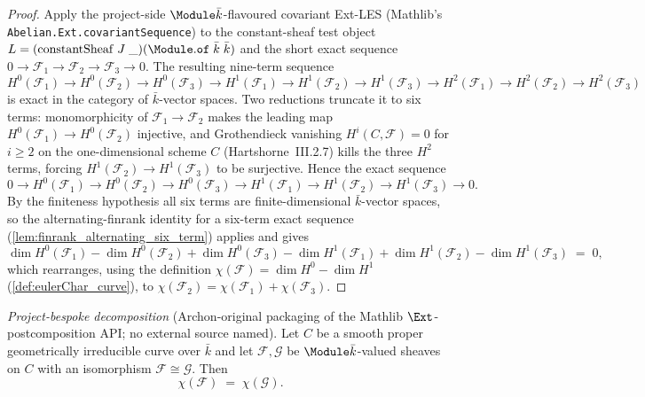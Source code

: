 \begin{proof}
  Apply the project-side \(\Module \bar k\)-flavoured covariant Ext-LES
  (Mathlib's \texttt{Abelian.Ext.covariantSequence}) to the constant-sheaf
  test object \(L = (\mathrm{constantSheaf}\;J\;\_)(\Module.\mathtt{of}\;
  \bar k\;\bar k)\) and the short exact sequence
  \(0 \to \mathcal F_1 \to \mathcal F_2 \to \mathcal F_3 \to 0\). The
  resulting nine-term sequence
  \[
    H^0(\mathcal F_1) \to H^0(\mathcal F_2) \to H^0(\mathcal F_3)
    \to H^1(\mathcal F_1) \to H^1(\mathcal F_2) \to H^1(\mathcal F_3)
    \to H^2(\mathcal F_1) \to H^2(\mathcal F_2) \to H^2(\mathcal F_3)
  \]
  is exact in the category of \(\bar k\)-vector spaces. Two reductions
  truncate it to six terms: monomorphicity of
  \(\mathcal F_1 \to \mathcal F_2\) makes the leading map
  \(H^0(\mathcal F_1) \to H^0(\mathcal F_2)\) injective, and Grothendieck
  vanishing \(H^i(C, \mathcal F) = 0\) for \(i \geq 2\) on the
  one-dimensional scheme \(C\) (Hartshorne~III.2.7) kills the three
  \(H^2\) terms, forcing \(H^1(\mathcal F_2) \to H^1(\mathcal F_3)\) to be
  surjective. Hence the exact sequence
  \[
    0 \to H^0(\mathcal F_1) \to H^0(\mathcal F_2) \to
    H^0(\mathcal F_3) \to H^1(\mathcal F_1) \to H^1(\mathcal F_2)
    \to H^1(\mathcal F_3) \to 0 .
  \]
  By the finiteness hypothesis all six terms are finite-dimensional
  \(\bar k\)-vector spaces, so the alternating-finrank identity for a
  six-term exact sequence (\cref{lem:finrank_alternating_six_term})
  applies and gives
  \[
    \dim H^0(\mathcal F_1) - \dim H^0(\mathcal F_2) + \dim H^0(\mathcal F_3)
    - \dim H^1(\mathcal F_1) + \dim H^1(\mathcal F_2) - \dim H^1(\mathcal F_3)
    \;=\; 0,
  \]
  which rearranges, using the definition
  \(\chi(\mathcal F) = \dim H^0 - \dim H^1\)
  (\cref{def:eulerChar_curve}), to
  \(\chi(\mathcal F_2) = \chi(\mathcal F_1) + \chi(\mathcal F_3)\).

\end{proof}

\begin{lemma}
  \label{lem:euler_char_iso}
  \textit{Project-bespoke decomposition} (Archon-original packaging of
  the Mathlib \(\Ext\)-postcomposition API; no external source named).
  Let \(C\) be a smooth proper geometrically irreducible curve over
  \(\bar k\) and let \(\mathcal F, \mathcal G\) be \(\Module \bar k\)-valued
  sheaves on \(C\) with an isomorphism \(\mathcal F \cong \mathcal G\).
  Then
  \[
    \chi(\mathcal F) \;=\; \chi(\mathcal G).
  \]
\end{lemma}

